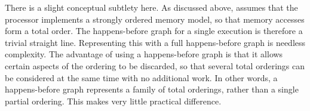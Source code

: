 There is a slight conceptual subtlety here.  As discussed above,
{\technique} assumes that the processor implements a strongly ordered
memory model, so that memory accesses form a total order.  The
happens-before graph for a single execution is therefore a trivial
straight line.  Representing this with a full happens-before graph is
needless complexity.  The advantage of using a happens-before graph is
that it allows certain aspects of the ordering to be discarded, so
that several total orderings can be considered at the same time with
no additional work.  In other words, a {\technique} happens-before
graph represents a family of total orderings, rather than a single
partial ordering.  This makes very little practical difference.


